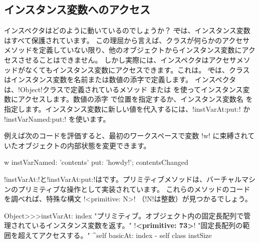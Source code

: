 \documentclass[a4paper,10pt,twoside]{book}
\begin{document}
\subsection{インスタンス変数へのアクセス}

インスペクタはどのように動いているのでしょうか？
\st では、インスタンス変数はすべて保護されています。
この理屈から言えば、クラスが何らかのアクセサメソッドを定義していない限り、他のオブジェクトからインスタンス変数にアクセスさせることはできません。
しかし実際には、インスペクタはアクセサメソッドがなくてもインスタンス変数にアクセスできます。これは。
\st では、クラスはインスタンス変数を名前または数値の添字で定義します。
インスペクタは、\ct!Object!クラスで定義されているメソッド  または  を使ってインスタンス変数にアクセスします。数値の添字  で位置を指定するか、インスタンス変数名  を指定します。インスタンス変数に新しい値を代入するには、\ct!instVarAt:put:! か \ct!instVarNamed:put:! を使います。

例えば次のコードを評価すると、最初のワークスペースで変数 \ct!w! に束縛されていたオブジェクトの内部状態を変更できます。

\begin{code}{}
w instVarNamed: 'contents' put: 'howdy!'; contentsChanged
\end{code}


\ct!instVarAt:!と\ct!instVarAt:put:!はです。プリミティブメソッドは、バーチャルマシンのプリミティブな操作として実装されています。
これらのメソッドのコードを調べれば、特殊な構文 \ct!<primitive: N>! （\ct!N!は整数）が見つかるでしょう。

\begin{code}{}
Object>>>instVarAt: index 
	"プリミティブ。オブジェクト内の固定長配列で管理されているインスタンス変数を返す。"
	!\textbf{<primitive: 73>}!
	"固定長配列の範囲を超えてアクセスする。"
	^self basicAt: index - self class instSize		
\end{code}
\end{document}
